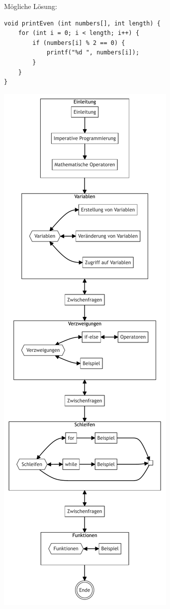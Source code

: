 \documentclass[a4paper]{article}
\begin{document}
\begin{minipage}[b][\textheight-1.6cm][t]{0.55\textwidth}
    Mögliche Lösung:
    \begin{verbatim}
void printEven (int numbers[], int length) {
    for (int i = 0; i < length; i++) {
        if (numbers[i] % 2 == 0) {
            printf("%d ", numbers[i]);
        }
    }
}
    \end{verbatim}
\end{minipage}\hspace*{5mm}\begin{minipage}[b][\textheight-1.6cm][t]{0.4\textwidth}
    \includegraphics[scale=0.5]{images/programmierung_lektion_flowchart.pdf}
\end{minipage}
\end{document}

